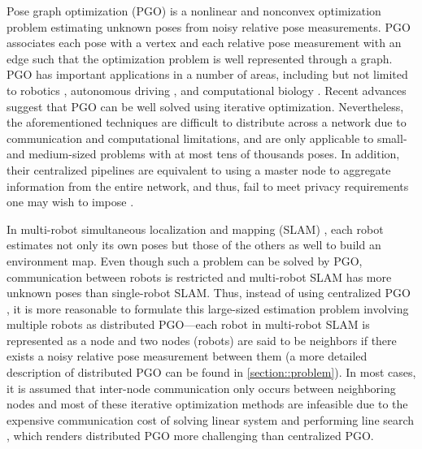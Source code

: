 Pose graph optimization (PGO) is a nonlinear and nonconvex optimization problem estimating unknown poses from noisy relative pose measurements. PGO associates each pose  with a vertex and each relative pose measurement with an edge such that the optimization problem is well represented through a graph. PGO has important applications in a number of areas, including but not limited to robotics \cite{cadena2016past,rosen4advances,thrun2005probabilistic}, autonomous driving \cite{geiger2012we}, and computational biology \cite{singer2011angular,singer2011three}. Recent advances \cite{rosen2014rise,rosen2016se,rosen2020scalable,dellaert2012factor,fan2019cpl,fan2020cpl,carlone2016planar,carlone2015lagrangian,grisetti2009nonlinear,briales2017cartan} suggest that PGO can be well solved using iterative optimization. Nevertheless, the aforementioned techniques \cite{rosen2014rise,rosen2016se,rosen2020scalable,dellaert2012factor,carlone2016planar,carlone2015lagrangian,grisetti2009nonlinear,fan2019cpl,briales2017cartan,fan2020cpl}  are difficult to distribute across a network due to communication and computational limitations, and  are only applicable to small- and medium-sized problems with at most tens of thousands poses.  In addition, their centralized pipelines are equivalent to using a master node to aggregate information from the entire network, and thus, fail to meet  privacy requirements one may wish to impose \cite{li2019coordinated,zhang2019complete}.

In multi-robot simultaneous localization and mapping (SLAM)  \cite{cunningham2010ddf,aragues2011multi,cunningham2013ddf,saeedi2016multiple,dong2015distributed,lajoie2020door,cieslewski2018data,tchuiev2020distributed,chang2020kimera,tian2021kimera}, each robot estimates not only its own poses but those of the others as well to build an environment map. Even though such a problem can be solved by PGO,  communication between  robots is restricted and multi-robot SLAM has more unknown poses than single-robot SLAM. Thus, instead of using centralized PGO \cite{rosen2014rise,rosen2016se,rosen2020scalable,dellaert2012factor,carlone2016planar,fan2020cpl,fan2019cpl,carlone2015lagrangian,grisetti2009nonlinear,briales2017cartan}, it is more reasonable to formulate this large-sized estimation problem involving multiple robots as distributed PGO---each robot in multi-robot SLAM is represented as a node and two nodes (robots) are said to be neighbors if there exists a noisy relative pose measurement between them (a more detailed description of distributed PGO can be found in \cref{section::problem}). In most cases, it is assumed that inter-node communication only occurs between neighboring nodes and most of these iterative optimization methods are infeasible  due to the expensive communication cost of solving linear system and performing line search \cite{rosen2014rise,rosen2016se,rosen2020scalable,dellaert2012factor,carlone2016planar,carlone2015lagrangian,grisetti2009nonlinear,fan2019cpl,briales2017cartan,fan2020cpl}, which renders distributed PGO  more challenging than centralized PGO.

